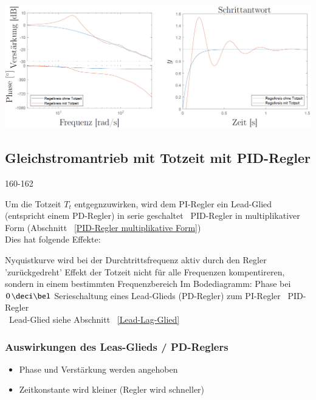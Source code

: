 \includegraphics[width=\columnwidth]{images/gleichstromantrieb_pi-regler_totzeit_step_response.png}


\subsection{Gleichstromantrieb mit Totzeit mit PID-Regler}{160-162}

Um die Totzeit $T_t$ entgegnzuwirken, wird dem PI-Regler ein Lead-Glied (entspricht einem PD-Regler) in serie geschaltet 
\textrightarrow\ PID-Regler in multiplikativer Form (Abschnitt ~\ref{PID-Regler multiplikative Form}) \\

Dies hat folgende Effekte:

\begin{outline}
    \1 Nyquistkurve wird bei der Durchtrittsfrequenz aktiv durch den Regler 'zurückgedreht' 
        \2 Effekt der Totzeit nicht für alle Frequenzen kompentireren, sondern in einem bestimmten Frequenzbereich
        \2 Im Bodediagramm: Phase bei $0 \, \deci \bel$ 
    \1 Serieschaltung eines Lead-Glieds (PD-Regler) zum PI-Regler \textrightarrow\ PID-Regler \\
        \textrightarrow\ Lead-Glied siehe Abschnitt ~\ref{Lead-Lag-Glied}
\end{outline}


\subsubsection{Auswirkungen des Leas-Glieds / PD-Reglers}

\begin{itemize}
    \item Phase und Verstärkung werden angehoben
    \item Zeitkonstante wird kleiner (Regler wird schneller)
\end{itemize}

